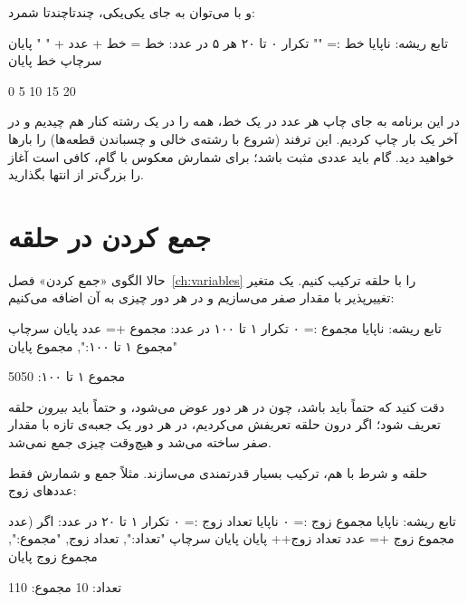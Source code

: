 و با  می‌توان به جای یکی‌یکی، چندتا‌چندتا شمرد:

\begin{salamfa}
تابع ریشه:
    ناپایا خط := ""
    تکرار ۰ تا ۲۰ هر ۵ در عدد:
        خط = خط + عدد + " "
    پایان
    سرچاپ خط
پایان
\end{salamfa}

\begin{outputfa}
0 5 10 15 20
\end{outputfa}

در این برنامه به جای چاپ هر عدد در یک خط، همه را در یک رشته کنار هم
چیدیم و در آخر یک بار چاپ کردیم. این ترفند (شروع با رشته‌ی خالی و چسباندن
قطعه‌ها) را بارها خواهید دید. گام باید عددی مثبت باشد؛ برای شمارش معکوس با
گام، کافی است آغاز را بزرگ‌تر از انتها بگذارید.

\section{جمع کردن در حلقه}

حالا الگوی «جمع کردن» فصل~\ref{ch:variables} را با حلقه ترکیب کنیم. یک
متغیر تغییرپذیر با مقدار صفر می‌سازیم و در هر دور چیزی به آن اضافه
می‌کنیم:

\begin{salamfa}
تابع ریشه:
    ناپایا مجموع := ۰
    تکرار ۱ تا ۱۰۰ در عدد:
        مجموع += عدد
    پایان
    سرچاپ "مجموع ۱ تا ۱۰۰:", مجموع
پایان
\end{salamfa}

\begin{outputfa}
مجموع ۱ تا ۱۰۰: 5050
\end{outputfa}

دقت کنید که  حتماً باید  باشد، چون در هر دور
عوض می‌شود، و حتماً باید \emph{بیرون} حلقه تعریف شود؛ اگر درون حلقه
تعریفش می‌کردیم، در هر دور یک جعبه‌ی تازه با مقدار صفر ساخته می‌شد و
هیچ‌وقت چیزی جمع نمی‌شد.

حلقه و شرط با هم، ترکیب بسیار قدرتمندی می‌سازند. مثلاً جمع و شمارش فقط
عددهای زوج:

\begin{salamfa}
تابع ریشه:
    ناپایا مجموع زوج := ۰
    ناپایا تعداد زوج := ۰
    تکرار ۱ تا ۲۰ در عدد:
        اگر (عدد %
            مجموع زوج += عدد
            تعداد زوج++
        پایان
    پایان
    سرچاپ "تعداد:", تعداد زوج, "مجموع:", مجموع زوج
پایان
\end{salamfa}

\begin{outputfa}
تعداد: 10 مجموع: 110
\end{outputfa}

